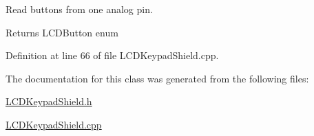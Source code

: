 Read buttons from one analog pin. 

\begin{DoxyReturn}{Returns}
L\+C\+D\+Button enum 
\end{DoxyReturn}


Definition at line 66 of file L\+C\+D\+Keypad\+Shield.\+cpp.



The documentation for this class was generated from the following files\+:\begin{DoxyCompactItemize}
\item 
\hyperlink{_l_c_d_keypad_shield_8h}{L\+C\+D\+Keypad\+Shield.\+h}\item 
\hyperlink{_l_c_d_keypad_shield_8cpp}{L\+C\+D\+Keypad\+Shield.\+cpp}\end{DoxyCompactItemize}

